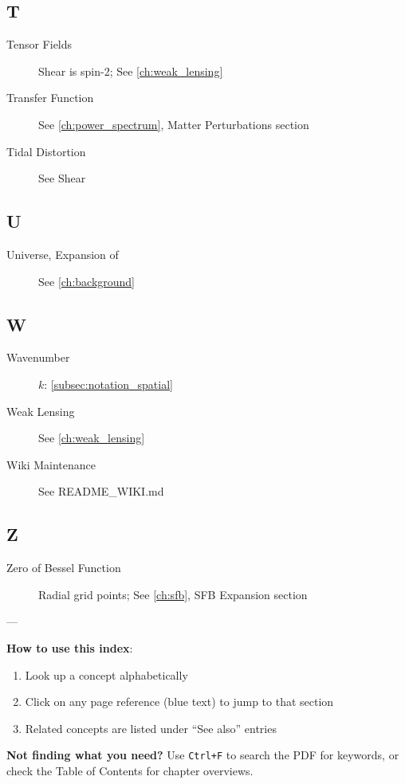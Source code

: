 \subsection{T}\label{subsec:idx_t}

\begin{description}
    \item[Tensor Fields] Shear is spin-2; See \cref{ch:weak_lensing}
    \item[Transfer Function] See \cref{ch:power_spectrum}, Matter Perturbations section
    \item[Tidal Distortion] See Shear
\end{description}

\subsection{U}\label{subsec:idx_u}

\begin{description}
    \item[Universe, Expansion of] See \cref{ch:background}
\end{description}

\subsection{W}\label{subsec:idx_w}

\begin{description}
    \item[Wavenumber] $k$: \autoref{subsec:notation_spatial}
    \item[Weak Lensing] See \cref{ch:weak_lensing}
    \item[Wiki Maintenance] See README\_WIKI.md
\end{description}

\subsection{Z}\label{subsec:idx_z}

\begin{description}
    \item[Zero of Bessel Function] Radial grid points; See \cref{ch:sfb}, SFB Expansion section
\end{description}

---

\noindent
\textbf{How to use this index}: 
\begin{enumerate}
    \item Look up a concept alphabetically
    \item Click on any page reference (blue text) to jump to that section
    \item Related concepts are listed under ``See also'' entries
\end{enumerate}

\noindent
\textbf{Not finding what you need?} Use \texttt{Ctrl+F} to search the PDF for keywords, or check the Table of Contents for chapter overviews.
